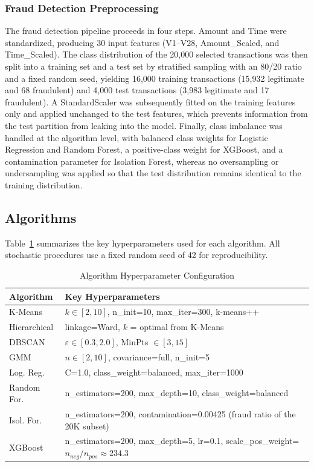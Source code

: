\documentclass[conference]{IEEEtran}
\begin{document}
\subsubsection{Fraud Detection Preprocessing}
The fraud detection pipeline proceeds in four steps. Amount and Time were standardized, producing 30 input features (V1--V28, Amount\_Scaled, and Time\_Scaled). The class distribution of the 20,000 selected transactions was then split into a training set and a test set by stratified sampling with an 80/20 ratio and a fixed random seed, yielding 16,000 training transactions (15,932 legitimate and 68 fraudulent) and 4,000 test transactions (3,983 legitimate and 17 fraudulent). A StandardScaler was subsequently fitted on the training features only and applied unchanged to the test features, which prevents information from the test partition from leaking into the model. Finally, class imbalance was handled at the algorithm level, with balanced class weights for Logistic Regression and Random Forest, a positive-class weight for XGBoost, and a contamination parameter for Isolation Forest, whereas no oversampling or undersampling was applied so that the test distribution remains identical to the training distribution.

\subsection{Algorithms}

Table~\ref{tab:hyperparams} summarizes the key hyperparameters used for each algorithm. All stochastic procedures use a fixed random seed of 42 for reproducibility.

\begin{table}[!t]
\centering
\caption{Algorithm Hyperparameter Configuration}
\label{tab:hyperparams}
\renewcommand{\arraystretch}{1.2}
\begin{tabular}{|l|p{4.5cm}|}
\hline
\textbf{Algorithm} & \textbf{Key Hyperparameters} \\
\hline
K-Means & $k \in [2,10]$, n\_init=10, max\_iter=300, k-means++ \\
\hline
Hierarchical & linkage=Ward, $k$ = optimal from K-Means \\
\hline
DBSCAN & $\varepsilon \in [0.3, 2.0]$, MinPts $\in [3, 15]$ \\
\hline
GMM & $n \in [2,10]$, covariance=full, n\_init=5 \\
\hline
Log. Reg. & C=1.0, class\_weight=balanced, max\_iter=1000 \\
\hline
Random For. & n\_estimators=200, max\_depth=10, class\_weight=balanced \\
\hline
Isol. For. & n\_estimators=200, contamination=0.00425 (fraud ratio of the 20K subset) \\
\hline
XGBoost & n\_estimators=200, max\_depth=5, lr=0.1, scale\_pos\_weight=$n_{neg}/n_{pos}\approx 234.3$ \\
\hline
\end{tabular}
\end{table}
\end{document}
